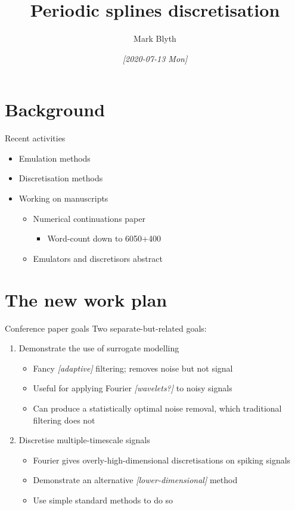 \documentclass[presentation]{beamer}
\author{Mark Blyth}
\date{\textit{[2020-07-13 Mon]}}
\title{Periodic splines discretisation}
\begin{document}
\maketitle

\section{Background}
\label{sec:org237984c}
\begin{frame}[label={sec:org64d126f}]{Recent activities}
\begin{itemize}
\item Emulation methods
\item Discretisation methods
\item Working on manuscripts
\begin{itemize}
\item Numerical continuations paper
\begin{itemize}
\item Word-count down to 6050+400
\end{itemize}
\item Emulators and discretisors abstract
\end{itemize}
\end{itemize}
\end{frame}

\section{The new work plan}
\label{sec:orgce9ab0d}
\begin{frame}[label={sec:org9cbb29b}]{Conference paper goals}
Two separate-but-related goals:
\vfill
\begin{enumerate}[<+->]
\item Demonstrate the use of surrogate modelling
\begin{itemize}
\item Fancy \emph{[adaptive]} filtering; removes noise but not signal
\item Useful for applying Fourier \emph{[wavelets?]} to noisy signals
\item Can produce a statistically optimal noise removal, which traditional filtering does not
\end{itemize}
\item Discretise multiple-timescale signals
\begin{itemize}
\item Fourier gives overly-high-dimensional discretisations on spiking signals
\item Demonstrate an alternative \emph{[lower-dimensional]} method
\item Use simple standard methods to do so
\end{itemize}
\end{enumerate}
\end{frame}
\end{document}
